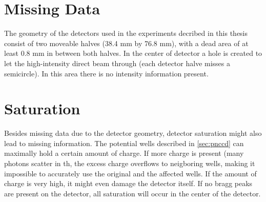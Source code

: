 \section{Missing Data}
The geometry of the detectors used in the experiments decribed in this
thesis consist of two moveable halves (38.4 mm by 76.8 mm), with a
dead area of at least 0.8 mm in between both halves. In the center of
detector a hole is created to let the high-intensity direct beam
through (each detector halve misses a semicircle). In this
area there is no intensity information present. 
 
\section{Saturation}
Besides missing data due to the detector geometry, detector saturation
might also lead to missing information. The potential wells described
in \ref{sec:pnccd} can maximally hold a certain amount of charge. If
more charge is present (many photons scatter in th, the excess charge overflows to neigboring
wells, making it impossible to accurately use the original and the
affected wells. If the amount of charge is very high, it might even
damage the detector itself. If no bragg peaks are present on the
detector, all saturation will occur in the center of the detector. 




